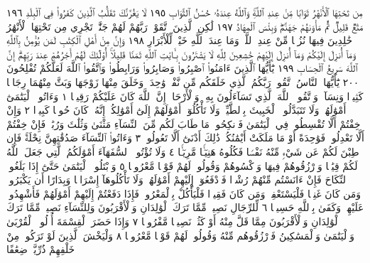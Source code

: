 مِن تَحْتِهَا ٱلْأَنْهَٰرُ ثَوَابࣰا مِّنْ عِندِ ٱللَّهِۚ وَٱللَّهُ عِندَهُۥ
حُسْنُ ٱلثَّوَابِ ١٩٥ لَا يَغُرَّنَّكَ تَقَلُّبُ ٱلَّذِينَ كَفَرُوا۟ فِي
ٱلْبِلَٰدِ ١٩٦ مَتَٰعࣱ قَلِيلࣱ ثُمَّ مَأْوَىٰهُمْ جَهَنَّمُۖ وَبِئْسَ ٱلْمِهَادُ ١٩٧
لَٰكِنِ ٱلَّذِينَ ٱتَّقَوْا۟ رَبَّهُمْ لَهُمْ جَنَّٰتࣱ تَجْرِي
مِن تَحْتِهَا ٱلْأَنْهَٰرُ خَٰلِدِينَ فِيهَا نُزُلࣰا مِّنْ
عِندِ ٱللَّهِۗ وَمَا عِندَ ٱللَّهِ خَيْرࣱ لِّلْأَبْرَارِ ١٩٨ وَإِنَّ مِنْ أَهْلِ
ٱلْكِتَٰبِ لَمَن يُؤْمِنُ بِٱللَّهِ وَمَآ أُنزِلَ إِلَيْكُمْ وَمَآ أُنزِلَ
إِلَيْهِمْ خَٰشِعِينَ لِلَّهِ لَا يَشْتَرُونَ بِـَٔايَٰتِ ٱللَّهِ ثَمَنࣰا
قَلِيلًاۚ أُو۟لَٰٓئِكَ لَهُمْ أَجْرُهُمْ عِندَ رَبِّهِمْۗ إِنَّ ٱللَّهَ
سَرِيعُ ٱلْحِسَابِ ١٩٩ يَٰٓأَيُّهَا ٱلَّذِينَ ءَامَنُوا۟ ٱصْبِرُوا۟
وَصَابِرُوا۟ وَرَابِطُوا۟ وَٱتَّقُوا۟ ٱللَّهَ لَعَلَّكُمْ تُفْلِحُونَ ٢٠٠
يَٰٓأَيُّهَا ٱلنَّاسُ ٱتَّقُوا۟ رَبَّكُمُ ٱلَّذِي خَلَقَكُم مِّن نَّفْسࣲ وَٰحِدَةࣲ وَخَلَقَ مِنْهَا
زَوْجَهَا وَبَثَّ مِنْهُمَا رِجَالࣰا كَثِيرࣰا وَنِسَآءࣰۚ وَٱتَّقُوا۟ ٱللَّهَ ٱلَّذِي تَسَآءَلُونَ بِهِۦ
وَٱلْأَرْحَامَۚ إِنَّ ٱللَّهَ كَانَ عَلَيْكُمْ رَقِيبࣰا ١ وَءَاتُوا۟ ٱلْيَتَٰمَىٰٓ أَمْوَٰلَهُمْۖ وَلَا تَتَبَدَّلُوا۟
ٱلْخَبِيثَ بِٱلطَّيِّبِۖ وَلَا تَأْكُلُوٓا۟ أَمْوَٰلَهُمْ إِلَىٰٓ أَمْوَٰلِكُمْۚ إِنَّهُۥ كَانَ حُوبࣰا كَبِيرࣰا ٢
وَإِنْ خِفْتُمْ أَلَّا تُقْسِطُوا۟ فِي ٱلْيَتَٰمَىٰ فَٱنكِحُوا۟ مَا طَابَ لَكُم مِّنَ ٱلنِّسَآءِ
مَثْنَىٰ وَثُلَٰثَ وَرُبَٰعَۖ فَإِنْ خِفْتُمْ أَلَّا تَعْدِلُوا۟ فَوَٰحِدَةً أَوْ مَا مَلَكَتْ أَيْمَٰنُكُمْۚ
ذَٰلِكَ أَدْنَىٰٓ أَلَّا تَعُولُوا۟ ٣ وَءَاتُوا۟ ٱلنِّسَآءَ صَدُقَٰتِهِنَّ نِحْلَةࣰۚ فَإِن طِبْنَ
لَكُمْ عَن شَيْءࣲ مِّنْهُ نَفْسࣰا فَكُلُوهُ هَنِيٓـࣰٔا مَّرِيٓـࣰٔا ٤ وَلَا تُؤْتُوا۟ ٱلسُّفَهَآءَ
أَمْوَٰلَكُمُ ٱلَّتِي جَعَلَ ٱللَّهُ لَكُمْ قِيَٰمࣰا وَٱرْزُقُوهُمْ فِيهَا وَٱكْسُوهُمْ وَقُولُوا۟ لَهُمْ
قَوْلࣰا مَّعْرُوفࣰا ٥ وَٱبْتَلُوا۟ ٱلْيَتَٰمَىٰ حَتَّىٰٓ إِذَا بَلَغُوا۟ ٱلنِّكَاحَ فَإِنْ ءَانَسْتُم مِّنْهُمْ
رُشْدࣰا فَٱدْفَعُوٓا۟ إِلَيْهِمْ أَمْوَٰلَهُمْۖ وَلَا تَأْكُلُوهَآ إِسْرَافࣰا وَبِدَارًا أَن يَكْبَرُوا۟ۚ
وَمَن كَانَ غَنِيࣰّا فَلْيَسْتَعْفِفْۖ وَمَن كَانَ فَقِيرࣰا فَلْيَأْكُلْ بِٱلْمَعْرُوفِۚ
فَإِذَا دَفَعْتُمْ إِلَيْهِمْ أَمْوَٰلَهُمْ فَأَشْهِدُوا۟ عَلَيْهِمْۚ وَكَفَىٰ بِٱللَّهِ حَسِيبࣰا ٦
لِّلرِّجَالِ نَصِيبࣱ مِّمَّا تَرَكَ ٱلْوَٰلِدَانِ وَٱلْأَقْرَبُونَ وَلِلنِّسَآءِ نَصِيبࣱ
مِّمَّا تَرَكَ ٱلْوَٰلِدَانِ وَٱلْأَقْرَبُونَ مِمَّا قَلَّ مِنْهُ أَوْ كَثُرَۚ نَصِيبࣰا
مَّفْرُوضࣰا ٧ وَإِذَا حَضَرَ ٱلْقِسْمَةَ أُو۟لُوا۟ ٱلْقُرْبَىٰ وَٱلْيَتَٰمَىٰ
وَٱلْمَسَٰكِينُ فَٱرْزُقُوهُم مِّنْهُ وَقُولُوا۟ لَهُمْ قَوْلࣰا مَّعْرُوفࣰا ٨
وَلْيَخْشَ ٱلَّذِينَ لَوْ تَرَكُوا۟ مِنْ خَلْفِهِمْ ذُرِّيَّةࣰ ضِعَٰفًا
